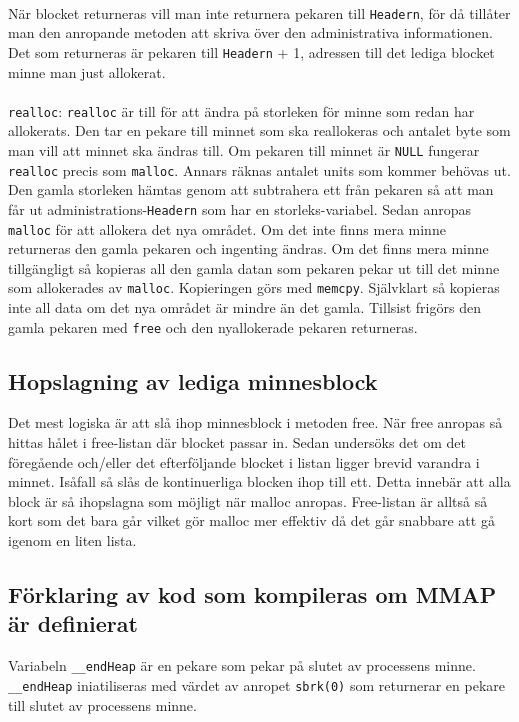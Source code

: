 \documentclass[a4paper]{article}
\begin{document}
\\
När blocket returneras vill man inte returnera pekaren till \texttt{Headern}, för då tillåter man den anropande metoden att skriva över den administrativa informationen. Det som returneras är pekaren till \texttt{Headern} + 1, adressen till det lediga blocket minne man just allokerat.
\\\\
\texttt{realloc}: \texttt{realloc} är till för att ändra på storleken för minne som redan har allokerats. Den tar en pekare till minnet som ska reallokeras och antalet byte som man vill att minnet ska ändras till. Om pekaren till minnet är \texttt{NULL} fungerar \texttt{realloc} precis som \texttt{malloc}. Annars räknas antalet units som kommer behövas ut. Den gamla storleken hämtas genom att subtrahera ett från pekaren så att man får ut administrations-\texttt{Headern} som har en storleks-variabel. Sedan anropas \texttt{malloc} för att allokera det nya området. Om det inte finns mera minne returneras den gamla pekaren och ingenting ändras. Om det finns mera minne tillgängligt så kopieras all den gamla datan som pekaren pekar ut till det minne som allokerades av \texttt{malloc}. Kopieringen görs med \texttt{memcpy}. Självklart så kopieras inte all data om det nya området är mindre än det gamla. Tillsist frigörs den gamla pekaren med \texttt{free} och den nyallokerade pekaren returneras. 


\subsection*{Hopslagning av lediga minnesblock }
Det mest logiska är att slå ihop minnesblock i metoden free. När free anropas så hittas hålet i free-listan där blocket passar in. Sedan undersöks det om det föregående och/eller det efterföljande blocket i listan ligger brevid varandra i minnet. Isåfall så slås de kontinuerliga blocken ihop till ett. Detta innebär att alla block är så ihopslagna som möjligt när malloc anropas. Free-listan är alltså så kort som det bara går vilket gör malloc mer effektiv då det går snabbare att gå igenom en liten lista.

\subsection*{Förklaring av kod som kompileras om MMAP är definierat}

Variabeln \texttt{\_\_endHeap} är en pekare som pekar på slutet av processens minne. \texttt{\_\_endHeap} iniatiliseras med värdet av anropet \texttt{sbrk(0)} som returnerar en pekare till slutet av processens minne.
\end{document}
